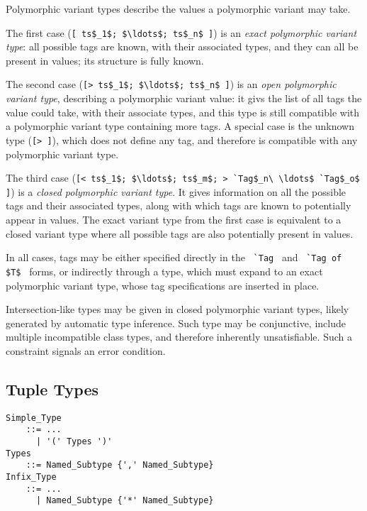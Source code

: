 Polymorphic variant types describe the values a polymorphic variant may take. 

The first case (\lstinline![ ts$_1$; $\ldots$; ts$_n$ ]!) is an {\em exact polymorphic variant type}: all possible tags are known, with their associated types, and they can all be present in values; its structure is fully known. 

The second case (\lstinline![> ts$_1$; $\ldots$; ts$_n$ ]!) is an {\em open polymorphic variant type}, describing a polymorphic variant value: it givs the list of all tags the value could take, with their associate types, and this type is still compatible with a polymorphic variant type containing more tags. A special case is the unknown type (\lstinline![> ]!), which does not define any tag, and therefore is compatible with any polymorphic variant type. 

The third case (\lstinline![< ts$_1$; $\ldots$; ts$_m$; > `Tag$_n\ \ldots$ `Tag$_o$ ]!) is a {\em closed polymorphic variant type}. It gives information on all the possible tags and their associated types, along with which tags are known to potentially appear in values. The exact variant type from the first case is equivalent to a closed variant type where all possible tags are also potentially present in values. 

In all cases, tags may be either specified directly in the ~\lstinline!`Tag!~ and ~\lstinline!`Tag of $T$!~ forms, or indirectly through a type, which must expand to an exact polymorphic variant type, whose tag specifications are inserted in place. 

Intersection-like types may be given in closed polymorphic variant types, likely generated by automatic type inference. Such type may be conjunctive, include multiple incompatible class types, and therefore inherently unsatisfiable. Such a constraint signals an error condition. 





\subsection{Tuple Types}
\label{sec:tuple-types}

\grammar\begin{lstlisting}
Simple_Type 
    ::= ...
      | '(' Types ')'
Types
    ::= Named_Subtype {',' Named_Subtype}
Infix_Type 
    ::= ...
      | Named_Subtype {'*' Named_Subtype}
\end{lstlisting}

